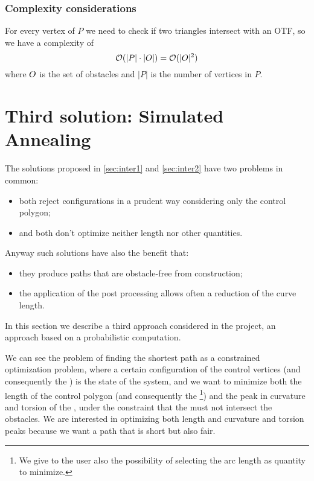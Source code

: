 \documentclass[dissertation.tex]{subfiles}
\begin{document}
\subsubsection{Complexity considerations}
For every vertex of $P$ we need to check if two triangles intersect
with an \ac{OTF}, so we have a complexity of
\begin{equation*}
  \mathcal{O}(|P|\cdot|O|)=\mathcal{O}(|O|^2)
\end{equation*}
where $O$ is the set of obstacles and $|P|$ is the number of vertices
in $P$.

\section{Third solution: Simulated Annealing}\label{sec:inter3}
The solutions proposed in \cref{sec:inter1} and \cref{sec:inter2} have two
problems in common:
\begin{itemize}
\item both reject configurations in a prudent way
  considering only the control polygon;
\item and both don't optimize neither
  length nor other quantities.
\end{itemize}
Anyway such solutions have also the benefit that:
\begin{itemize}
\item they produce paths that are obstacle-free from construction;
\item the application of the post processing allows often a reduction
  of the curve length.
\end{itemize}

In this section we describe a third
approach considered in the project, an approach based on a
probabilistic computation.
    
We can see the problem of finding the shortest path as a constrained
optimization problem, where a certain configuration of the control
vertices (and
consequently the \bs) is the state of the system, and we want to
minimize both the length of the control polygon (and consequently the
\bs\footnote{We give to the user also the possibility of selecting the
  arc length as quantity to minimize.}) and the peak in curvature and torsion of the \bs, under
the constraint that the \bs must not intersect the obstacles. We
are interested in optimizing both length and curvature and torsion
peaks because we want a path that is short but also fair.
\end{document}

